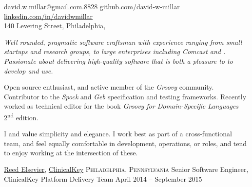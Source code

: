 \documentclass[10pt,a4paper]{article}
\begin{document}
\sloppy


\nobreakvspace{0.3em}  %
\noindent\href{mailto:david.w.millar.at.gmail.com}{david.w.millar\mbox{}@\mbox{}gmail.com}\hspace{1.7mm}.8828
\sbull
\href{http://www.github.com/david-w-millar}{github.com/david-w-millar}\sbull
\href{http://www.linkedin.com/in/davidwmillar}{linkedin.com/in/davidwmillar}
\\
140 Levering Street, Philadelphia,

\spacedhrule{0.9em}{-0.4em}


\vspace{-1.3em}  %
\begin{multicols}{2}  %
  \emph{
    Well rounded, pragmatic software craftsman with experience ranging from small startups and research groups, to large enterprises including Comcast and .
    Passionate about delivering high-quality software that is both a pleasure to to develop and use.
  }

Open source enthusiast, and active member of the \emph{Groovy} community.
Contributor to the \emph{Spock} and \emph{Geb} specification and testing frameworks.
Recently worked as technical editor for the book \emph{Groovy for Domain-Specific Languages}  2\textsuperscript{nd} edition.

I and value simplicity and elegance.
I work best as part of a cross-functional team, and feel equally comfortable in development, operations, or  roles, and tend to enjoy working at the intersection of these.

\end{multicols}


\spacedhrule{0em}{-0.4em}


\headedsection
{\href{http://www.elsevier.com/}{Reed Elsevier}, \href{http://www.clinicalkey.com/}{ClinicalKey}}
  {\textsc{Philadelphia, Pennsylvania}} {%
  \headedsubsection
    {Senior Software Engineer, ClinicalKey Platform Delivery Team}
    {April 2014 -- September 2015}
    {}
}
\end{document}
